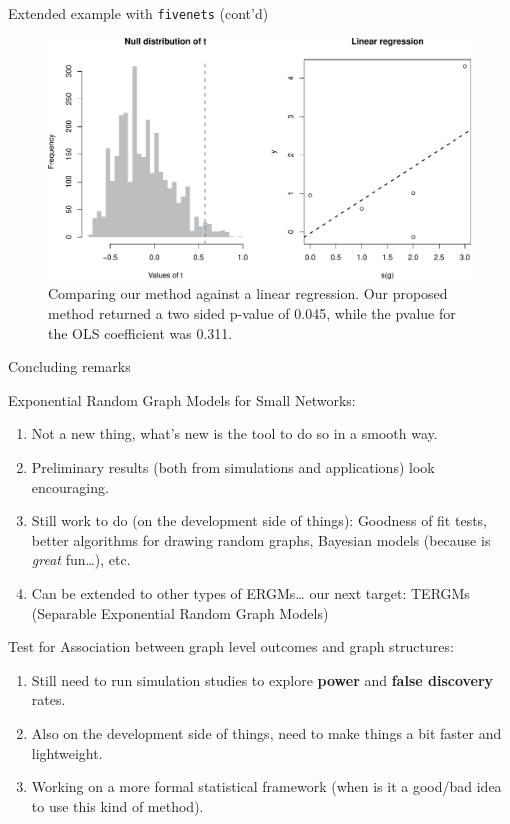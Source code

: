 \documentclass[10pt,ignorenonframetext,aspectratio=169,]{beamer}
\begin{document}
\begin{frame}{Extended example with \texttt{fivenets} (cont'd)}
\protect\hypertarget{extended-example-with-fivenets-contd}{}

\begin{figure}
\centering

\scriptsize


\includegraphics[width=.7\linewidth]{index_files/figure-beamer/fivenets-print-results-partII-1} 
\normalsize

\caption{Comparing our method against a linear regression. Our proposed method returned a two sided p-value of 0.045, while the pvalue for the OLS coefficient was 0.311.}
\end{figure}

\end{frame}

\begin{frame}{Concluding remarks}
\protect\hypertarget{concluding-remarks}{}

Exponential Random Graph Models for Small Networks:\pause

\begin{enumerate}
\item
  Not a new thing,\pause{} what's new is the tool to do so in a smooth
  way.\pause
\item
  Preliminary results (both from simulations and applications) look
  encouraging.\pause
\item
  Still work to do (on the development side of things): Goodness of fit
  tests, better algorithms for drawing random graphs, Bayesian models
  \pause (because is \emph{great} fun\ldots{}), etc.\pause
\item
  Can be extended to other types of ERGMs\ldots{} our next target:
  TERGMs (Separable Exponential Random Graph Models)\pause
\end{enumerate}

Test for Association between graph level outcomes and graph
structures:\pause

\begin{enumerate}
\item
  Still need to run simulation studies to explore \textbf{power} and
  \textbf{false discovery} rates.\pause
\item
  Also on the development side of things, need to make things a bit
  faster and lightweight.\pause
\item
  Working on a more formal statistical framework (when is it a good/bad
  idea to use this kind of method).
\end{enumerate}

\end{frame}
\end{document}
